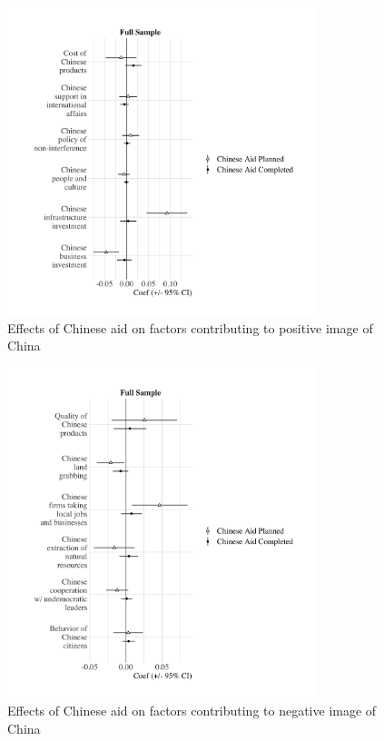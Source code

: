 \documentclass[9pt]{article}
\begin{document}
\begin{figure}[H]
\centering
\caption{Effects of Chinese aid on factors contributing to positive image of China}
\includegraphics[width=0.8\textwidth]{figures/figure_04.png}
\end{figure}

\begin{figure}[H]
\centering
\caption{Effects of Chinese aid on factors contributing to negative image of China}
\includegraphics[width=0.8\textwidth]{figures/figure_05.png}
\end{figure}
\end{document}
